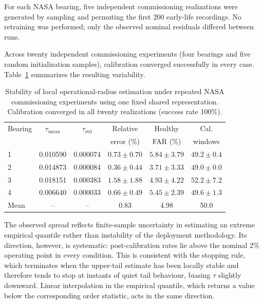 \documentclass[numbered]{trbunofficial}
\begin{document}
For each NASA bearing, five independent commissioning realizations were generated by sampling and permuting the first 200 early-life recordings.
No retraining was performed; only the observed nominal residuals differed between runs.

Across twenty independent commissioning experiments (four bearings and five
random initialization samples), calibration converged successfully in every
case. Table~\ref{tab:nasa-stability} summarizes the resulting variability.

\begin{table}[!ht]
\centering
\caption{Stability of local operational-radius estimation under repeated
NASA commissioning experiments using one fixed shared representation.
Calibration converged in all twenty realizations (success rate 100\%).}
\label{tab:nasa-stability}
\footnotesize
\setlength{\tabcolsep}{4pt}
\begin{tabular}{@{}lccccc@{}}
\toprule
Bearing & $\tau_{\mathrm{mean}}$ & $\tau_{\mathrm{std}}$ & Relative   & Healthy   & Cal.    \\
        &                        &                       & error (\%) & FAR (\%)  & windows \\
\midrule
1 & 0.010590 & 0.000074 & $0.73 \pm 0.70$ & $5.84 \pm 3.79$ & $49.2 \pm 0.4$ \\
2 & 0.014873 & 0.000084 & $0.36 \pm 0.44$ & $3.71 \pm 3.33$ & $49.0 \pm 0.0$ \\
3 & 0.018151 & 0.000383 & $1.58 \pm 1.88$ & $4.93 \pm 4.22$ & $52.2 \pm 7.2$ \\
4 & 0.006640 & 0.000033 & $0.66 \pm 0.49$ & $5.45 \pm 2.39$ & $49.6 \pm 1.3$ \\
\midrule
Mean & -- & -- & 0.83 & 4.98 & 50.0 \\
\bottomrule
\end{tabular}
\end{table}


The observed spread reflects finite-sample uncertainty in estimating an extreme
empirical quantile rather than instability of the deployment methodology. Its
direction, however, is systematic: post-calibration rates lie above the nominal
2\% operating point in every condition. This is consistent with the stopping
rule, which terminates when the upper-tail estimate has been locally stable and
therefore tends to stop at instants of quiet tail behaviour, biasing $\tau$
slightly downward. Linear interpolation in the empirical quantile, which
returns a value below the corresponding order statistic, acts in the same
direction.
\end{document}
